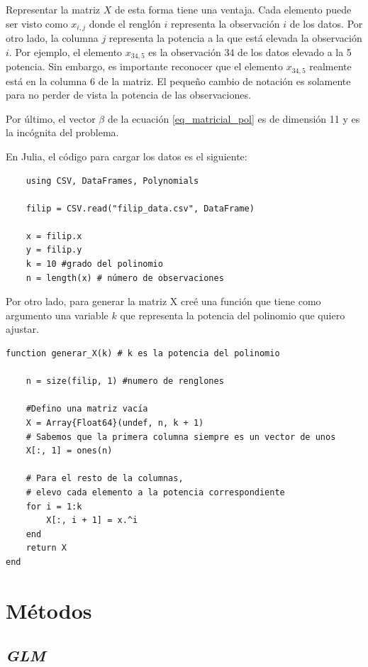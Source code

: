 Representar la matriz $X$ de esta forma tiene una ventaja. Cada elemento puede ser visto como $x_{i, j}$ donde el renglón $i$ representa la observación $i$ de los datos. Por otro lado, la columna $j$ representa la potencia a la que está elevada la observación $i$. Por ejemplo, el elemento $x_{34, 5}$ es la observación 34 de los datos elevado a la 5 potencia. Sin embargo, es importante reconocer que el elemento $x_{34, 5}$ realmente está en la columna 6 de la matriz. El pequeño cambio de notación es solamente para no perder de vista la potencia de las observaciones. 


Por último, el vector $\beta$ de la ecuación \ref{eq_matricial_pol} es de dimensión 11 y es la incógnita del problema. 


En Julia, el código para cargar los datos es el siguiente: 

\begin{verbatim}
    using CSV, DataFrames, Polynomials
    
    filip = CSV.read("filip_data.csv", DataFrame)

    x = filip.x
    y = filip.y
    k = 10 #grado del polinomio
    n = length(x) # número de observaciones
\end{verbatim}

Por otro lado, para generar la matriz X creé una función que tiene como argumento una variable $k$ que representa la potencia del polinomio que quiero ajustar. 

\begin{verbatim}
function generar_X(k) # k es la potencia del polinomio

    n = size(filip, 1) #numero de renglones
    
    #Defino una matriz vacía
    X = Array{Float64}(undef, n, k + 1)
    # Sabemos que la primera columna siempre es un vector de unos
    X[:, 1] = ones(n)
    
    # Para el resto de la columnas,
    # elevo cada elemento a la potencia correspondiente
    for i = 1:k
        X[:, i + 1] = x.^i
    end
    return X
end
\end{verbatim}


\section{Métodos}

\subsection{\textit{GLM}}

